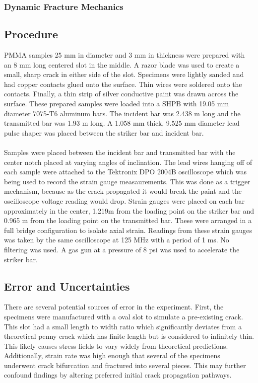 \documentclass[12pt]{article}
\begin{document}
\subsubsection{Dynamic Fracture Mechanics} %

\subsection{Procedure} %
PMMA samples 25 mm in diameter and 3 mm in thickness were prepared with an 8 mm long centered slot in the middle. A razor blade was used to create a small, sharp crack in either side of the slot. Specimens were lightly sanded and had copper contacts glued onto the surface. Thin wires were soldered onto the contacts. Finally, a thin strip of silver conductive paint was drawn across the surface. These prepared samples were loaded into a SHPB with 19.05 mm diameter 7075-T6 aluminum bars. The incident bar was 2.438 m long and the transmitted bar was 1.93 m long. A 1.058 mm thick, 9.525 mm diameter lead pulse shaper was placed between the striker bar and incident bar.
\\ \\
Samples were placed between the incident bar and transmitted bar with the center notch placed at varying angles of inclination. The lead wires hanging off of each sample were attached to the Tektronix DPO 2004B oscilloscope which was being used to record the strain gauge measaurements. This was done as a trigger mechanism, because as the crack propagated it would break the paint and the oscilloscope voltage reading would drop. Strain gauges were placed on each bar approximately in the center, 1.219m from the loading point on the striker bar and 0.965 m from the loading point on the transmitted bar. These were arranged in a full bridge configuration to isolate axial strain. Readings from these strain gauges was taken by the same oscilloscope at 125 MHz with a period of 1 ms. No filtering was used. A gas gun at a pressure of 8 psi was used to accelerate the striker bar.
\subsection{Error and Uncertainties} %
There are several potential sources of error in the experiment. First, the specimens were manufactured with a oval slot to simulate a pre-existing crack. This slot had a small length to width ratio which significantly deviates from a theoretical penny crack which has finite length but is considered to infinitely thin. This likely causes stress fields to vary widely from theoretical predictions. Additionally, strain rate was high enough that several of the specimens underwent crack bifurcation and fractured into several pieces. This may further confound findings by altering preferred initial crack propagation pathways. 
\end{document}
